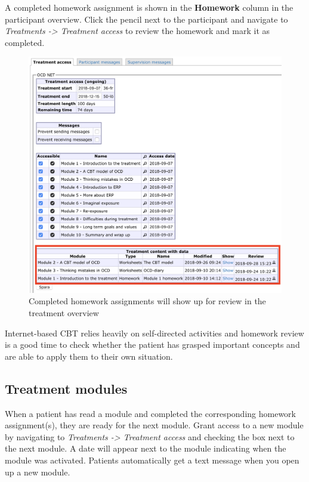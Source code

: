 \documentclass[]{book}
\theoremstyle{definition}
\theoremstyle{definition}
\theoremstyle{definition}
\theoremstyle{remark}
\begin{document}
A completed homework assignment is shown in the \textbf{Homework} column
in the participant overview. Click the pencil next to the participant
and navigate to \emph{Treatments -\textgreater{} Treatment access} to
review the homework and mark it as completed.

\begin{figure}
\centering
\includegraphics{images/homework-complete.png}
\caption{Completed homework assignments will show up for review in the
treatment overview}
\end{figure}

Internet-based CBT relies heavily on self-directed activities and
homework review is a good time to check whether the patient has grasped
important concepts and are able to apply them to their own situation.

\hypertarget{treatment-modules}{%
\subsection{Treatment modules}\label{treatment-modules}}

When a patient has read a module and completed the corresponding
homework assignment(s), they are ready for the next module. Grant access
to a new module by navigating to \emph{Treatments -\textgreater{}
Treatment access} and checking the box next to the next module. A date
will appear next to the module indicating when the module was activated.
Patients automatically get a text message when you open up a new module.
\end{document}
